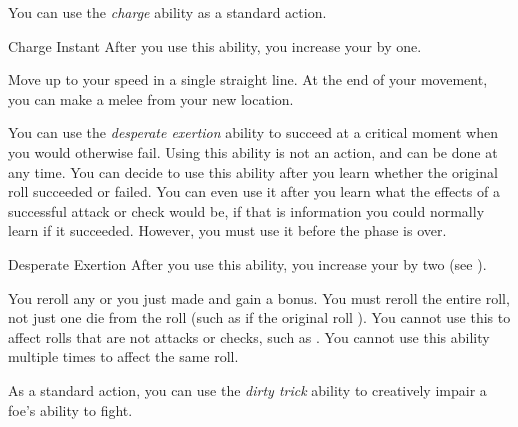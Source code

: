          You can use the \textit{charge} ability as a standard action.

        \begin{instantability}{Charge}
            \label{Charge}
            Instant
            \rankline
            After you use this ability, you increase your  by one.

            Move up to your speed in a single straight line.
            At the end of your movement, you can make a melee  from your new location.
        \end{instantability}

        \label{desperate exertion} You can use the \textit{desperate exertion} ability to succeed at a critical moment when you would otherwise fail.
        Using this ability is not an action, and can be done at any time.
        You can decide to use this ability after you learn whether the original roll succeeded or failed.
        You can even use it after you learn what the effects of a successful attack or check would be, if that is information you could normally learn if it succeeded.
        However, you must use it before the phase is over.

        \begin{instantability}{Desperate Exertion}
            \label{Desperate Exertion}
            \rankline
            After you use this ability, you increase your  by two (see ).

            You reroll any  or  you just made and gain a  bonus.
            You must reroll the entire roll, not just one die from the roll (such as if the original roll ).
            You cannot use this to affect rolls that are not attacks or checks, such as .
            You cannot use this ability multiple times to affect the same roll.
        \end{instantability}

         As a standard action, you can use the \textit{dirty trick} ability to creatively impair a foe's ability to fight.

